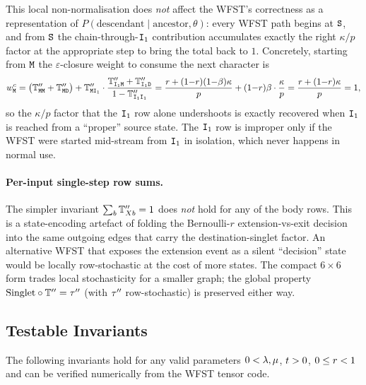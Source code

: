 This local non-normalisation does \emph{not} affect the WFST's
correctness as a representation of $P(\text{descendant}\mid
\text{ancestor},\theta)$: every WFST path begins at ${\tt S}$, and from
${\tt S}$ the chain-through-${\tt I}_1$ contribution accumulates exactly the
right $\kappa/p$ factor at the appropriate step to bring the total
back to $1$.  Concretely, starting from ${\tt M}$ the $\varepsilon$-closure
weight to consume the next character is
\[
w_{\tt M}^c
=\bigl(\mathbb{T}''_{{\tt M}{\tt M}}+\mathbb{T}''_{{\tt M}{\tt D}}\bigr)
+\mathbb{T}''_{{\tt M}{\tt I}_1}\cdot
   \frac{\mathbb{T}''_{{\tt I}_1{\tt M}}+\mathbb{T}''_{{\tt I}_1{\tt D}}}{1-\mathbb{T}''_{{\tt I}_1{\tt I}_1}}
=\frac{r+(1{-}r)(1{-}\beta)\kappa}{p}+(1{-}r)\beta\cdot\frac{\kappa}{p}
=\frac{r+(1{-}r)\kappa}{p}=1,
\]
so the $\kappa/p$ factor that the ${\tt I}_1$ row alone undershoots is
exactly recovered when ${\tt I}_1$ is reached from a ``proper'' source
state.  The ${\tt I}_1$ row is improper only if the WFST were started
mid-stream from ${\tt I}_1$ in isolation, which never happens in normal
use.

\paragraph{Per-input single-step row sums.}
The simpler invariant $\sum_b\mathbb{T}''_{Xb}=1$ does \emph{not} hold
for any of the body rows.  This is a state-encoding artefact of folding
the Bernoulli-$r$ extension-vs-exit decision into the same outgoing
edges that carry the destination-singlet factor.  An alternative WFST
that exposes the extension event as a silent ``decision'' state would
be locally row-stochastic at the cost of more states.  The compact
$6{\times}6$ form trades local stochasticity for a smaller graph;
the global property
$\text{Singlet}\circ\mathbb{T}''=\tau''$
(with $\tau''$ row-stochastic) is preserved either way.

\subsection{Testable Invariants}
\label{sec:wfst-invariants}

The following invariants hold for any valid parameters
$0 < \lambda, \mu$, $t > 0$, $0 \leq r < 1$
and can be verified numerically from the WFST tensor code.

